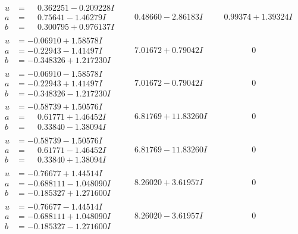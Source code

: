 \documentclass[1p]{elsarticle_modified}
\theoremstyle{definition}
\begin{document}
$$\begin{array}{c|c|c}
\begin{aligned}
u &= \phantom{-}0.362251 - 0.209228 I \\
a &= \phantom{-}0.75641 - 1.46279 I \\
b &= \phantom{-}0.300795 + 0.976137 I\end{aligned}
 & \phantom{-}0.48660 - 2.86183 I & \phantom{-}0.99374 + 1.39324 I \\ \hline\begin{aligned}
u &= -0.06910 + 1.58578 I \\
a &= -0.22943 - 1.41497 I \\
b &= -0.348326 + 1.217230 I\end{aligned}
 & \phantom{-}7.01672 + 0.79042 I & \phantom{-0.000000 } 0 \\ \hline\begin{aligned}
u &= -0.06910 - 1.58578 I \\
a &= -0.22943 + 1.41497 I \\
b &= -0.348326 - 1.217230 I\end{aligned}
 & \phantom{-}7.01672 - 0.79042 I & \phantom{-0.000000 } 0 \\ \hline\begin{aligned}
u &= -0.58739 + 1.50576 I \\
a &= \phantom{-}0.61771 + 1.46452 I \\
b &= \phantom{-}0.33840 - 1.38094 I\end{aligned}
 & \phantom{-}6.81769 + 11.83260 I & \phantom{-0.000000 } 0 \\ \hline\begin{aligned}
u &= -0.58739 - 1.50576 I \\
a &= \phantom{-}0.61771 - 1.46452 I \\
b &= \phantom{-}0.33840 + 1.38094 I\end{aligned}
 & \phantom{-}6.81769 - 11.83260 I & \phantom{-0.000000 } 0 \\ \hline\begin{aligned}
u &= -0.76677 + 1.44514 I \\
a &= -0.688111 - 1.048090 I \\
b &= -0.185327 + 1.271600 I\end{aligned}
 & \phantom{-}8.26020 + 3.61957 I & \phantom{-0.000000 } 0 \\ \hline\begin{aligned}
u &= -0.76677 - 1.44514 I \\
a &= -0.688111 + 1.048090 I \\
b &= -0.185327 - 1.271600 I\end{aligned}
 & \phantom{-}8.26020 - 3.61957 I & \phantom{-0.000000 } 0\\

\end{array}$$
\end{document}
